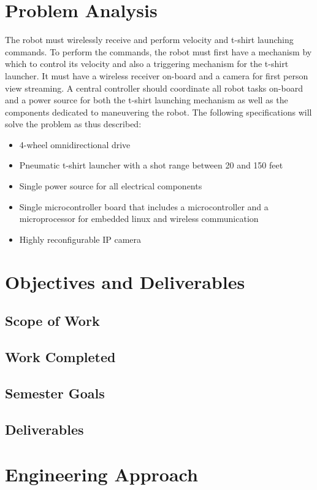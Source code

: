 \documentclass[letterpaper,12pt]{article}
\begin{document}
\section{Problem Analysis}
The robot must wirelessly receive and perform velocity and t-shirt launching commands. To perform the commands, the robot must first have a mechanism by which to control its velocity and also a triggering mechanism for the t-shirt launcher. It must have a wireless receiver on-board and a camera for first person view streaming. A central controller should coordinate all robot tasks on-board and a power source for both the t-shirt launching mechanism as well as the components dedicated to maneuvering the robot. The following specifications will solve the problem as thus described:
\begin{itemize}
    \item 4-wheel omnidirectional drive
    \item Pneumatic t-shirt launcher with a shot range between 20 and 150 feet
    \item Single power source for all electrical components
    \item Single microcontroller board that includes a microcontroller and a microprocessor for embedded linux and wireless communication
    \item Highly reconfigurable IP camera
\end{itemize}

\section{Objectives and Deliverables}
\subsection{Scope of Work}
\subsection{Work Completed}
\subsection{Semester Goals}
\subsection{Deliverables}

\section{Engineering Approach}
\end{document}
